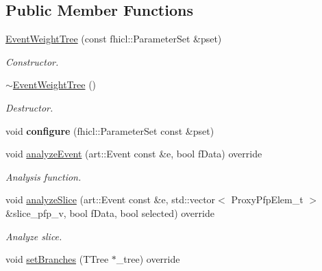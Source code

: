 \subsection*{Public Member Functions}
\begin{DoxyCompactItemize}
\item 
\hyperlink{classanalysis_1_1EventWeightTree_a481af16f4e8721805bbe7fb5f0b1da2a}{Event\+Weight\+Tree} (const fhicl\+::\+Parameter\+Set \&pset)
\begin{DoxyCompactList}\small\item\em Constructor. \end{DoxyCompactList}\item 
\hyperlink{classanalysis_1_1EventWeightTree_ac4c13dc05b4378d910f25afdd410475b}{$\sim$\+Event\+Weight\+Tree} ()\hypertarget{classanalysis_1_1EventWeightTree_ac4c13dc05b4378d910f25afdd410475b}{}\label{classanalysis_1_1EventWeightTree_ac4c13dc05b4378d910f25afdd410475b}

\begin{DoxyCompactList}\small\item\em Destructor. \end{DoxyCompactList}\item 
void {\bfseries configure} (fhicl\+::\+Parameter\+Set const \&pset)\hypertarget{classanalysis_1_1EventWeightTree_a1998d34a8451a1e7ec8a6131fc50f97d}{}\label{classanalysis_1_1EventWeightTree_a1998d34a8451a1e7ec8a6131fc50f97d}

\item 
void \hyperlink{classanalysis_1_1EventWeightTree_a1af84126be9ecd2ae71013db4d2c1af7}{analyze\+Event} (art\+::\+Event const \&e, bool f\+Data) override\hypertarget{classanalysis_1_1EventWeightTree_a1af84126be9ecd2ae71013db4d2c1af7}{}\label{classanalysis_1_1EventWeightTree_a1af84126be9ecd2ae71013db4d2c1af7}

\begin{DoxyCompactList}\small\item\em Analysis function. \end{DoxyCompactList}\item 
void \hyperlink{classanalysis_1_1EventWeightTree_a2e30de7f19d6f20e6c3f7ffdb41b22a6}{analyze\+Slice} (art\+::\+Event const \&e, std\+::vector$<$ Proxy\+Pfp\+Elem\+\_\+t $>$ \&slice\+\_\+pfp\+\_\+v, bool f\+Data, bool selected) override\hypertarget{classanalysis_1_1EventWeightTree_a2e30de7f19d6f20e6c3f7ffdb41b22a6}{}\label{classanalysis_1_1EventWeightTree_a2e30de7f19d6f20e6c3f7ffdb41b22a6}

\begin{DoxyCompactList}\small\item\em Analyze slice. \end{DoxyCompactList}\item 
void \hyperlink{classanalysis_1_1EventWeightTree_a7f86ad4b26cab90a5e90a84d57530a26}{set\+Branches} (T\+Tree $\ast$\+\_\+tree) override\hypertarget{classanalysis_1_1EventWeightTree_a7f86ad4b26cab90a5e90a84d57530a26}{}\label{classanalysis_1_1EventWeightTree_a7f86ad4b26cab90a5e90a84d57530a26}


\end{DoxyCompactItemize}
